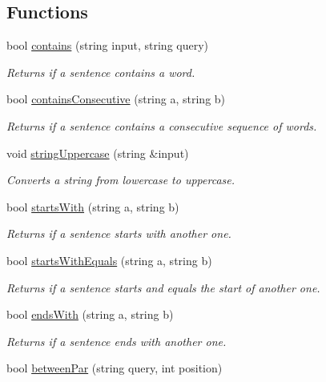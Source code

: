 \subsection*{Functions}
\begin{DoxyCompactItemize}
\item 
bool \hyperlink{namespaceutils_a69c832543a093a8099189e4755695a62}{contains} (string input, string query)
\begin{DoxyCompactList}\small\item\em Returns if a sentence contains a word. \end{DoxyCompactList}\item 
bool \hyperlink{namespaceutils_af9af9e01b679f955003203f29ddf130b}{contains\+Consecutive} (string a, string b)
\begin{DoxyCompactList}\small\item\em Returns if a sentence contains a consecutive sequence of words. \end{DoxyCompactList}\item 
void \hyperlink{namespaceutils_a4cc31521e740c9e31b4bfa8ee85eff46}{string\+Uppercase} (string \&input)
\begin{DoxyCompactList}\small\item\em Converts a string from lowercase to uppercase. \end{DoxyCompactList}\item 
bool \hyperlink{namespaceutils_ae840ea1b4ad4ce23c2b48158ac75d557}{starts\+With} (string a, string b)
\begin{DoxyCompactList}\small\item\em Returns if a sentence starts with another one. \end{DoxyCompactList}\item 
bool \hyperlink{namespaceutils_ac8cc8683906877c69cfea7cb2812ed07}{starts\+With\+Equals} (string a, string b)
\begin{DoxyCompactList}\small\item\em Returns if a sentence starts and equals the start of another one. \end{DoxyCompactList}\item 
bool \hyperlink{namespaceutils_a57772e91d08481b38c47cda04479e169}{ends\+With} (string a, string b)
\begin{DoxyCompactList}\small\item\em Returns if a sentence ends with another one. \end{DoxyCompactList}\item 
bool \hyperlink{namespaceutils_a1e1de2e5772bffdfe2c8d3309a61ddab}{between\+Par} (string query, int position)

\end{DoxyCompactItemize}
